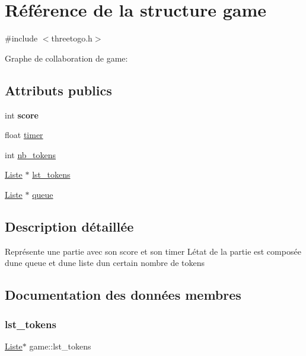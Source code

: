 \hypertarget{structgame}{}\section{Référence de la structure game}
\label{structgame}


{\ttfamily \#include $<$threetogo.\+h$>$}



Graphe de collaboration de game\+:
\subsection*{Attributs publics}
\begin{DoxyCompactItemize}
\item 
\mbox{\label{structgame_af3ed17909828bd041bda4844f48dba23}} 
int {\bfseries score}
\item 
float \hyperlink{structgame_ac6709bdba458183dc12107255e6a8846}{timer}
\item 
int \hyperlink{structgame_a68b9c8753fce84f68b88f17fa7737298}{nb\+\_\+tokens}
\item 
\hyperlink{threetogo_8h_a976a52d066ba7588a35e660807a4dd75}{Liste} $\ast$ \hyperlink{structgame_a42b294d7620b524290160f188263214d}{lst\+\_\+tokens}
\item 
\hyperlink{threetogo_8h_a976a52d066ba7588a35e660807a4dd75}{Liste} $\ast$ \hyperlink{structgame_a9313d74aee727133f1b7929d43ca2bd3}{queue}
\end{DoxyCompactItemize}


\subsection{Description détaillée}
Représente une partie avec son score et son timer L\textquotesingle{}état de la partie est composée d\textquotesingle{}une queue et d\textquotesingle{}une liste d\textquotesingle{}un certain nombre de tokens 

\subsection{Documentation des données membres}
\mbox{\label{structgame_a42b294d7620b524290160f188263214d}} 
\subsubsection{\texorpdfstring{lst\+\_\+tokens}{lst\_tokens}}
{\footnotesize\ttfamily \hyperlink{threetogo_8h_a976a52d066ba7588a35e660807a4dd75}{Liste}$\ast$ game\+::lst\+\_\+tokens}

